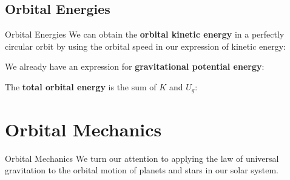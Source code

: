 \documentclass[12pt,compress,aspectratio=169]{beamer}
\begin{document}
\subsection{Orbital Energies}

\begin{frame}{Orbital Energies}
  We can obtain the \textbf{orbital kinetic energy} in a perfectly circular
  orbit by using the orbital speed in our expression of kinetic energy:


  \vspace{-.11in}We already have an expression for
  \textbf{gravitational potential energy}:

  
  \vspace{-.1in}The \textbf{total orbital energy} is the sum of $K$ and $U_g$:

\end{frame}



\section{Orbital Mechanics}

\begin{frame}{Orbital Mechanics}
  We turn our attention to applying the law of universal gravitation to the
  orbital motion of planets and stars in our solar system.
\end{frame}
\end{document}
